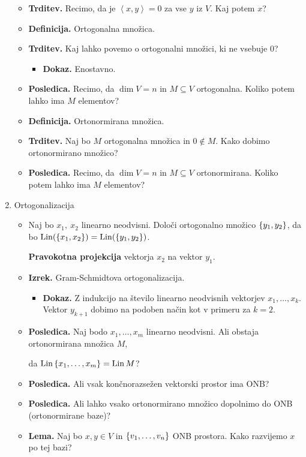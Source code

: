 \begin{enumerate}
\begin{itemize}
        \item \colorbox{blue!30}{\textbf{Trditev.}} Recimo, da je $\left\langle x, y\right\rangle = 0$ za vse $y$ iz $V$. Kaj potem $x$?
        \item \colorbox{purple!30}{\textbf{Definicija.}} Ortogonalna množica.
        \item \colorbox{blue!30}{\textbf{Trditev.}} Kaj lahko povemo o ortogonalni množici, ki ne vsebuje $0$?
        \begin{itemize}
            \item \colorbox{green!30}{\textbf{Dokaz.}} Enostavno.
        \end{itemize}
        \item \colorbox{orange!30}{\textbf{Posledica.}} Recimo, da $\dim V = n$ in $M \subseteq V$ ortogonalna. Koliko potem lahko ima $M$ elementov?
        \item \colorbox{purple!30}{\textbf{Definicija.}} Ortonormirana množica.
        \item \colorbox{blue!30}{\textbf{Trditev.}} Naj bo $M$ ortogonalna množica in $0 \notin M$. Kako dobimo ortonormirano množico?
        \item \colorbox{orange!30}{\textbf{Posledica.}} Recimo, da $\dim V = n$ in $M \subseteq V$ ortonormirana. Koliko potem lahko ima $M$ elementov?
    \end{itemize}
    \item Ortogonalizacija
    \begin{itemize}
        \item Naj bo $x_1, \ x_2$ linearno neodvisni. Določi ortogonalno množico $\left\{y_1, y_2\right\}$, da bo $\operatorname{Lin}(\left\{x_1, x_2\right\}) = \operatorname{Lin}(\left\{y_1, y_2\right\})$. 
        
        \textbf{Pravokotna projekcija} vektorja $x_2$ na vektor $y_1$.
        \item \colorbox{blue!30}{\textbf{Izrek.}} Gram-Schmidtova ortogonalizacija.
        \begin{itemize}
            \item \colorbox{green!30}{\textbf{Dokaz.}} Z indukcijo na število linearno neodvisnih vektorjev $x_1, \ldots, x_k$.             
            Vektor $y_{k+1}$ dobimo na podoben način kot v primeru za $k=2$.
        \end{itemize}
        \item \colorbox{orange!30}{\textbf{Posledica.}} Naj bodo $x_1, \ldots, x_m$ linearno neodvisni. Ali obstaja ortonormirana množica $M$, 
        
        da $\operatorname{Lin} \left\{x_1, \ldots, x_m\right\} = \operatorname{Lin} M$?
        \item \colorbox{orange!30}{\textbf{Posledica.}} Ali vsak končnorazsežen vektorski prostor ima ONB?
        \item \colorbox{orange!30}{\textbf{Posledica.}}  Ali lahko vsako ortonormirano množico dopolnimo do ONB (ortonormirane baze)?
        \newpage
        \item \colorbox{blue!30}{\textbf{Lema.}} Naj bo $x, y \in V$ in $\left\{v_1, \ldots, v_n\right\}$ ONB prostora. Kako razvijemo $x$ po tej bazi? 
        

\end{itemize}
\end{enumerate}
